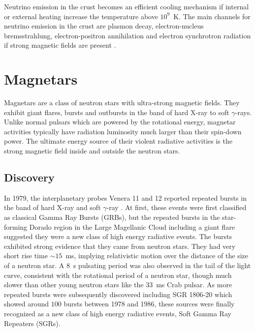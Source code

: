 Neutrino emission in the crust becomes an efficient cooling mechanism if internal or external heating increase the temperature above $10^9$~K. 
The main channels for neutrino emission in the crust are plasmon decay, electron-nucleus bremsstrahlung, electron-positron annihilation and electron synchrotron radiation if strong magnetic fields are present \citep{2001PhR...354....1Y}.

\section{Magnetars}
\label{sec:intro-magnetars}

Magnetars are a class of neutron stars with ultra-strong magnetic fields. 
They exhibit giant flares, bursts and outbursts in the band of hard X-ray to soft $\gamma$-rays. 
Unlike normal pulsars which are powered by the rotational energy, magnetar activities typically have radiation luminosity much larger than their spin-down power.
The ultimate energy source of their violent radiative activities is the strong magnetic field inside and outside the neutron stars.

\subsection{Discovery}
\label{sec:intro-magnetar-discovery}

In 1979, the interplanetary probes Venera 11 and 12 reported repeated bursts in the band of hard X-ray and soft $\gamma$-ray \citep{1979SvAL....5...87M}.
At first, these events were first classified as classical Gamma Ray Bursts (GRBs), but the repeated bursts in the star-forming Dorado region in the Large Magellanic Cloud including a giant flare \citep{1979Natur.282..587M} suggested they were a new class of high energy radiative events. 
The bursts exhibited strong evidence that they came from neutron stars.
They had very short rise time $\sim 15$~ms, implying relativistic motion over the distance of the size of a neutron star.
A $8$~s pulsating period was also observed in the tail of the light curve, consistent with the rotational period of a neutron star, though much slower than other young neutron stars like the $33$~ms Crab pulsar.
As more repeated bursts were subsequently discovered including SGR 1806-20 \citep{1987ApJ...322L..21K,1987ApJ...320L.111L} which showed around $100$ bursts between 1978 and 1986, these sources were finally recognized as a new class of high energy radiative events, Soft Gamma Ray Repeaters (SGRs).

